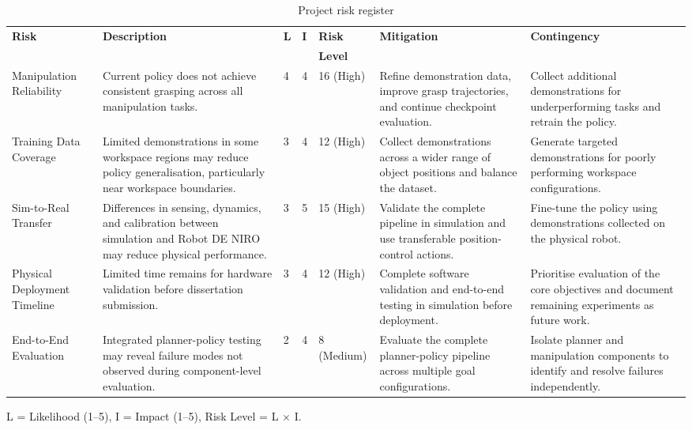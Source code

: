 \documentclass[conference, 12pt]{IEEEtran}
\begin{document}
\begin{table}[h]
\centering
\caption{Project risk register}
\label{tab:risk_register}
\renewcommand{\arraystretch}{1.2}
\begin{tabular}{p{2.5cm} p{3.8cm} p{0.2cm} p{0.2cm} p{1.6cm} p{3.5cm} p{3.5cm}}
\hline
\textbf{Risk} &
\textbf{Description} &
\textbf{L} &
\textbf{I} &
\textbf{Risk} &
\textbf{Mitigation} &
\textbf{Contingency} \\
 &
 &
 &
 &
\textbf{Level} &
 &
\\
\hline

Manipulation Reliability &
Current policy does not achieve consistent grasping across all manipulation tasks. &
4 &
4 &
16 (High) &
Refine demonstration data, improve grasp trajectories, and continue checkpoint evaluation. &
Collect additional demonstrations for underperforming tasks and retrain the policy. \\

Training Data Coverage &
Limited demonstrations in some workspace regions may reduce policy generalisation, particularly near workspace boundaries. &
3 &
4 &
12 (High) &
Collect demonstrations across a wider range of object positions and balance the dataset. &
Generate targeted demonstrations for poorly performing workspace configurations. \\

Sim-to-Real Transfer &
Differences in sensing, dynamics, and calibration between simulation and Robot DE NIRO may reduce physical performance. &
3 &
5 &
15 (High) &
Validate the complete pipeline in simulation and use transferable position-control actions. &
Fine-tune the policy using demonstrations collected on the physical robot. \\

Physical Deployment Timeline &
Limited time remains for hardware validation before dissertation submission. &
3 &
4 &
12 (High) &
Complete software validation and end-to-end testing in simulation before deployment. &
Prioritise evaluation of the core objectives and document remaining experiments as future work. \\

End-to-End Evaluation &
Integrated planner-policy testing may reveal failure modes not observed during component-level evaluation. &
2 &
4 &
8 (Medium) &
Evaluate the complete planner-policy pipeline across multiple goal configurations. &
Isolate planner and manipulation components to identify and resolve failures independently. \\

\hline
\end{tabular}

\footnotesize
L = Likelihood (1--5), I = Impact (1--5), Risk Level = L $\times$ I.
\end{table}
\end{document}
